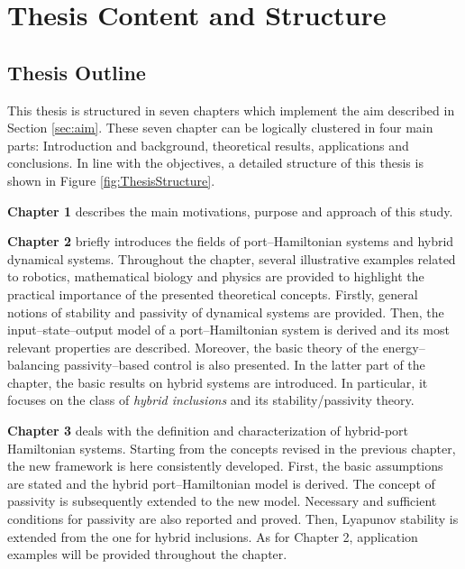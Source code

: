 %
\clearpage

\section{Thesis Content and Structure}
\subsection{Thesis Outline}
This thesis is structured in seven chapters which implement the aim described in Section \ref{sec:aim}. 
These seven chapter can be logically clustered in four main parts: Introduction and background, theoretical results, applications and conclusions. In line with the objectives, a detailed structure of this thesis is shown in Figure \ref{fig:ThesisStructure}.
%
\newline

%
\textbf{Chapter 1} describes the main motivations, purpose and approach of this study.
%
\newline

%
\textbf{Chapter 2} briefly introduces the fields of port--Hamiltonian systems and hybrid dynamical systems. Throughout the chapter, several illustrative examples related to robotics, mathematical biology and physics are provided to highlight the practical importance of the presented theoretical concepts. 
Firstly, general notions of stability and passivity of dynamical systems are provided.
Then, the input--state--output model of a port--Hamiltonian system is derived and its most relevant properties are described. Moreover, the basic theory of the energy--balancing passivity--based control is also presented. In the latter part of the chapter, the basic results on hybrid systems are introduced. In particular, it focuses on the class of \textit{hybrid inclusions} and its stability/passivity theory. 
%
\newline

%
\textbf{Chapter 3} deals with the definition and characterization of hybrid-port Hamiltonian systems. Starting from the concepts revised in the previous chapter, the new framework is here consistently developed. First, the basic assumptions are stated and the hybrid port--Hamiltonian model is derived. The concept of passivity is subsequently extended to the new model. Necessary and sufficient conditions for passivity are also reported and proved. Then, Lyapunov stability is extended from the one for hybrid inclusions. As for Chapter 2, application examples will be provided throughout the chapter.
%
\newline

